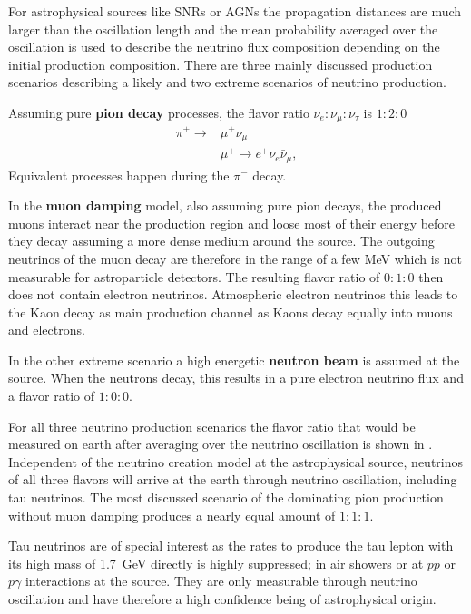 For astrophysical sources like SNRs or AGNs the propagation distances are much larger than the oscillation length and the mean probability averaged over the oscillation is used to describe the neutrino flux composition depending on the initial production composition.
There are three mainly discussed production scenarios describing a likely and two extreme scenarios of neutrino production.

Assuming pure \textbf{pion decay} processes, the flavor ratio $\nu_e : \nu_{\mu} : \nu_{\tau}$ is $1:2:0$
\begin{align}
    \pi^+ \to &\mu^+ \nu_\mu \\
    &\mu^+ \to e^+ \nu_e \bar{\nu}_{\mu} ,
\end{align}
Equivalent processes happen during the $\pi^-$ decay.

In the \textbf{muon damping} model, also assuming pure pion decays, the produced muons interact near the production region and loose most of their energy before they decay assuming a more dense medium around the source.
The outgoing neutrinos of the muon decay are therefore in the range of a few MeV which is not measurable for astroparticle detectors.
The resulting flavor ratio of $0:1:0$ then does not contain electron neutrinos.
Atmospheric electron neutrinos this leads to the Kaon decay as main production channel as Kaons decay equally into muons and electrons.

In the other extreme scenario a high energetic \textbf{neutron beam} is assumed at the source.
When the neutrons decay, this results in a pure electron neutrino flux and a flavor ratio of $1:0:0$.

For all three neutrino production scenarios the flavor ratio that would be measured on earth after averaging over the neutrino oscillation is shown in .
Independent of the neutrino creation model at the astrophysical source, neutrinos of all three flavors will arrive at the earth through neutrino oscillation, including tau neutrinos.
The most discussed scenario of the dominating pion production without muon damping produces a nearly equal amount of $1:1:1$.

Tau neutrinos are of special interest as the rates to produce the tau lepton with its high mass of \SI{1.7}{GeV} directly is highly suppressed; in air showers or at $pp$ or $p\gamma$ interactions at the source.
They are only measurable through neutrino oscillation and have therefore a high confidence being of astrophysical origin.


